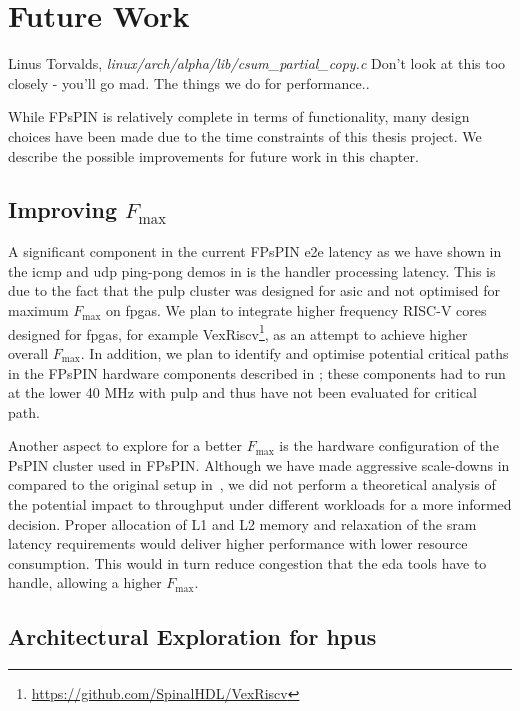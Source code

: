 \chapter{Future Work}
\begin{chapquote}{Linus Torvalds, \emph{linux/arch/alpha/lib/csum\_partial\_copy.c}}
Don't look at this too closely - you'll go mad.  The things we do for performance..
\end{chapquote}

While FPsPIN is relatively complete in terms of functionality, many design choices have been made due to the time constraints of this thesis project.  We describe the possible improvements for future work in this chapter.

\section{Improving $F_{\text{max}}$} \label{sec:improving-fmax}

A significant component in the current FPsPIN \ac{e2e} latency as we have shown in the \ac{icmp} and \ac{udp} ping-pong demos in  is the handler processing latency.  This is due to the fact that the \ac{pulp} cluster was designed for \ac{asic} and not optimised for maximum $F_{\text{max}}$ on \ac{fpga}s.  We plan to integrate higher frequency RISC-V cores designed for \ac{fpga}s, for example VexRiscv\footnote{\url{https://github.com/SpinalHDL/VexRiscv}}, as an attempt to achieve higher overall $F_\text{max}$. In addition, we plan to identify and optimise potential critical paths in the FPsPIN hardware components described in ; these components had to run at the lower 40 MHz with \ac{pulp} and thus have not been evaluated for critical path.

Another aspect to explore for a better $F_\text{max}$ is the hardware configuration of the PsPIN cluster used in FPsPIN.  Although we have made aggressive scale-downs in  compared to the original setup in~\cite{di_girolamo_pspin_2021}, we did not perform a theoretical analysis of the potential impact to throughput under different workloads for a more informed decision.  Proper allocation of L1 and L2 memory and relaxation of the \ac{sram} latency requirements would deliver higher performance with lower resource consumption.  This would in turn reduce congestion that the \ac{eda} tools have to handle, allowing a higher $F_\text{max}$.

\section{Architectural Exploration for \acs{hpu}s} \label{sec:hpu-arch}

